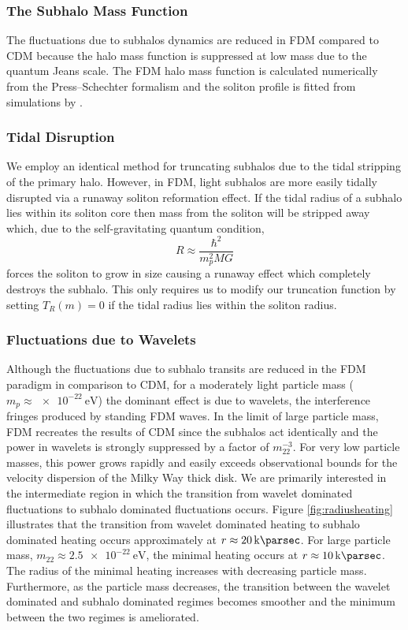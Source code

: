 \documentclass[usenatbib]{mnras}
\begin{document}
\subsubsection{The Subhalo Mass Function}

The fluctuations due to subhalos dynamics are reduced in FDM compared to CDM because the halo mass function is suppressed at low mass due to the quantum Jeans scale. The FDM halo mass function is calculated numerically from the Press--Schechter formalism \citep{substructure_FDM, marsh} and the soliton profile is fitted from simulations by \cite{schive_solitons}. 


\subsubsection{Tidal Disruption}

We employ an identical method for truncating subhalos due to the tidal stripping of the primary halo. However, in FDM, light subhalos are more easily tidally disrupted via a runaway soliton reformation effect. If the tidal radius of a subhalo lies within its soliton core then mass from the soliton will be stripped away which, due to the self-gravitating quantum condition,
\begin{equation}
R \approx \frac{\hbar^2}{m_p^2 M G}
\end{equation} 
forces the soliton to grow in size causing a runaway effect which completely destroys the subhalo. This only requires us to modify our truncation function by setting $T_R(m) = 0$ if the tidal radius lies within the soliton radius. 


\subsubsection{Fluctuations due to Wavelets}

Although the fluctuations due to subhalo transits are reduced in the FDM paradigm in comparison to CDM, for a moderately light particle mass ($m_p \approx \SI{e-22}{\electronvolt}$) the dominant effect is due to wavelets, the interference fringes produced by standing FDM waves. In the limit of large particle mass, FDM recreates the results of CDM since the subhalos act identically and the power in wavelets is strongly suppressed by a factor of $m_{22}^{-3}$. For very low particle masses, this power grows rapidly and easily exceeds observational bounds for the velocity dispersion of the Milky Way thick disk. We are primarily interested in the intermediate region in which the transition from wavelet dominated fluctuations to subhalo dominated fluctuations occurs. Figure \ref{fig:radiusheating} illustrates that the transition from wavelet dominated heating to subhalo dominated heating occurs approximately at $r \approx \SI{20}{\kilo \parsec}$. For large particle mass, $m_{22} \approx \SI{2.5e-22}{\electronvolt}$, the minimal heating occurs at $r \approx \SI{10}{\kilo \parsec}$. The radius of the minimal heating increases with decreasing particle mass. Furthermore, as the particle mass decreases, the transition between the wavelet dominated and subhalo dominated regimes becomes smoother and the minimum between the two regimes is ameliorated.   
\end{document}
